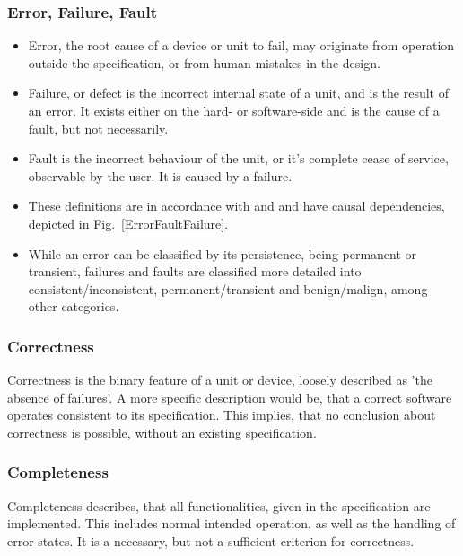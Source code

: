 	\subsubsection{Error, Failure, Fault}
	\begin{minipage}{\linewidth}
	\begin{itemize}
		\item {Error}, the root cause of a device or unit to fail, may originate from operation outside the specification, or from human mistakes in the design.
		\item {Failure}, or defect is the incorrect internal state of a unit, and is the result of an error. It exists either on the hard- or software-side and is the cause of a fault, but not necessarily.
		\item {Fault} is the incorrect behaviour of the unit, or it's complete cease of service, observable by the user. It is caused by a failure.
		\item These definitions are in accordance with \cite{Liggesmeyer2002} and \cite{Kopetz1997} and have causal dependencies, depicted in Fig.~\ref{ErrorFaultFailure}.
		\item While an error can be classified by its persistence, being permanent or transient, failures and faults are classified more detailed into consistent/inconsistent, permanent/transient and benign/malign, among other categories.
	\end{itemize}
	\end{minipage}
	
	\subsubsection{Correctness}
		{Correctness} is the binary feature of a unit or device, loosely described as 'the absence of failures'. A more specific description would be, that a correct software operates consistent to its specification. This implies, that no conclusion about correctness is possible, without an existing specification.
	\subsubsection{Completeness}
		{Completeness} describes, that all functionalities, given in the specification are implemented. This includes normal intended operation, as well as the handling of error-states. It is a necessary, but not a sufficient criterion for correctness.
